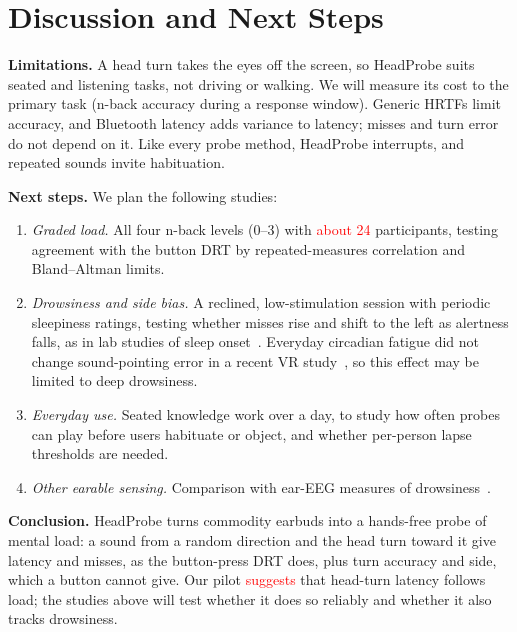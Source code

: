 \documentclass[conference,letterpaper]{IEEEtran}
\newcommand{\ph}[1]{\textcolor{red}{#1}}
\begin{document}
\section{Discussion and Next Steps}
\label{sec:next}
\textbf{Limitations.} A head turn takes the eyes off the screen, so HeadProbe suits seated and
listening tasks, not driving or walking. We will measure its cost to the primary task (n-back accuracy
during a response window). Generic HRTFs limit accuracy, and Bluetooth latency adds variance to
latency; misses and turn error do not depend on it. Like every probe method, HeadProbe interrupts,
and repeated sounds invite habituation.

\textbf{Next steps.} We plan the following studies:
\begin{enumerate}
\item \emph{Graded load.} All four n-back levels (0--3) with \ph{about 24} participants, testing
  agreement with the button DRT by repeated-measures correlation and Bland--Altman limits.
\item \emph{Drowsiness and side bias.} A reclined, low-stimulation session with periodic sleepiness
  ratings, testing whether misses rise and shift to the left as alertness falls, as in lab studies of
  sleep onset~\cite{bareham2014losing}. Everyday circadian fatigue did not change sound-pointing error in
  a recent VR study~\cite{minton2025longitudinal}, so this effect may be limited to deep drowsiness.
\item \emph{Everyday use.} Seated knowledge work over a day, to study how often probes can play
  before users habituate or object, and whether per-person lapse thresholds are needed.
\item \emph{Other earable sensing.} Comparison with ear-EEG measures of
  drowsiness~\cite{kaveh2024wireless}.
\end{enumerate}

\textbf{Conclusion.} HeadProbe turns commodity earbuds into a hands-free probe of mental load: a
sound from a random direction and the head turn toward it give latency and misses, as the
button-press DRT does, plus turn accuracy and side, which a button cannot give. Our pilot
\ph{suggests} that head-turn latency follows load; the studies above will test whether it does so
reliably and whether it also tracks drowsiness.



\end{document}
